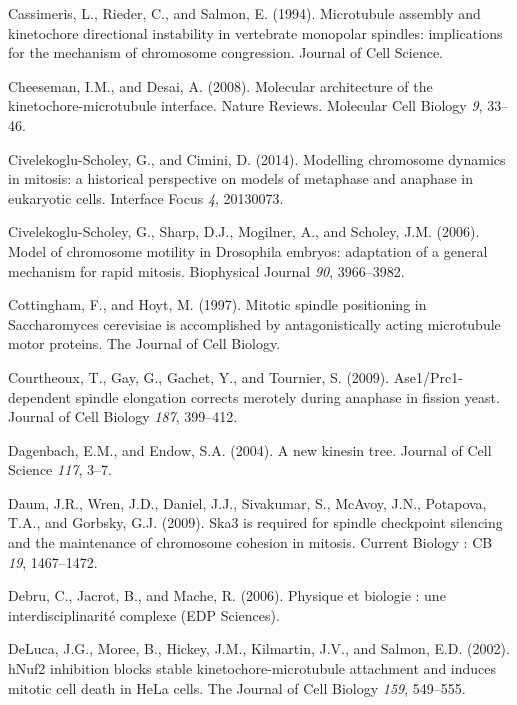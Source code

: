 \documentclass[12pt,a4paper,twoside,openright]{book}
\begin{document}
\hypertarget{ref-Cassimeris1994}{}
Cassimeris, L., Rieder, C., and Salmon, E. (1994). Microtubule assembly
and kinetochore directional instability in vertebrate monopolar
spindles: implications for the mechanism of chromosome congression.
Journal of Cell Science.

\hypertarget{ref-Cheeseman2008}{}
Cheeseman, I.M., and Desai, A. (2008). Molecular architecture of the
kinetochore-microtubule interface. Nature Reviews. Molecular Cell
Biology \emph{9}, 33--46.

\hypertarget{ref-Civelekoglu-Scholey2014}{}
Civelekoglu-Scholey, G., and Cimini, D. (2014). Modelling chromosome
dynamics in mitosis: a historical perspective on models of metaphase and
anaphase in eukaryotic cells. Interface Focus \emph{4}, 20130073.

\hypertarget{ref-Civelekoglu-Scholey2006}{}
Civelekoglu-Scholey, G., Sharp, D.J., Mogilner, A., and Scholey, J.M.
(2006). Model of chromosome motility in Drosophila embryos: adaptation
of a general mechanism for rapid mitosis. Biophysical Journal \emph{90},
3966--3982.

\hypertarget{ref-Cottingham1997}{}
Cottingham, F., and Hoyt, M. (1997). Mitotic spindle positioning in
Saccharomyces cerevisiae is accomplished by antagonistically acting
microtubule motor proteins. The Journal of Cell Biology.

\hypertarget{ref-Courtheoux2009}{}
Courtheoux, T., Gay, G., Gachet, Y., and Tournier, S. (2009).
Ase1/Prc1-dependent spindle elongation corrects merotely during anaphase
in fission yeast. Journal of Cell Biology \emph{187}, 399--412.

\hypertarget{ref-Dagenbach2004}{}
Dagenbach, E.M., and Endow, S.A. (2004). A new kinesin tree. Journal of
Cell Science \emph{117}, 3--7.

\hypertarget{ref-Daum2009}{}
Daum, J.R., Wren, J.D., Daniel, J.J., Sivakumar, S., McAvoy, J.N.,
Potapova, T.A., and Gorbsky, G.J. (2009). Ska3 is required for spindle
checkpoint silencing and the maintenance of chromosome cohesion in
mitosis. Current Biology : CB \emph{19}, 1467--1472.

\hypertarget{ref-Debru}{}
Debru, C., Jacrot, B., and Mache, R. (2006). Physique et biologie : une
interdisciplinarité complexe (EDP Sciences).

\hypertarget{ref-DeLuca2002}{}
DeLuca, J.G., Moree, B., Hickey, J.M., Kilmartin, J.V., and Salmon, E.D.
(2002). hNuf2 inhibition blocks stable kinetochore-microtubule
attachment and induces mitotic cell death in HeLa cells. The Journal of
Cell Biology \emph{159}, 549--555.
\end{document}

